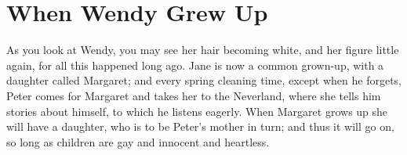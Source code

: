 
\chapter{When Wendy Grew Up}

As you look at Wendy,
you may see her hair becoming white,
and her figure little again,
for all this happened long ago.
Jane is now a common grown-up,
with a daughter called Margaret;
and every spring cleaning time,
except when he forgets,
Peter comes for Margaret and takes her to the Neverland,
where she tells him stories about himself,
to which he listens eagerly.
When Margaret grows up she will have a daughter,
who is to be Peter’s mother in turn;
and thus it will go on,
so long as children are gay and innocent and heartless.

\endinput

